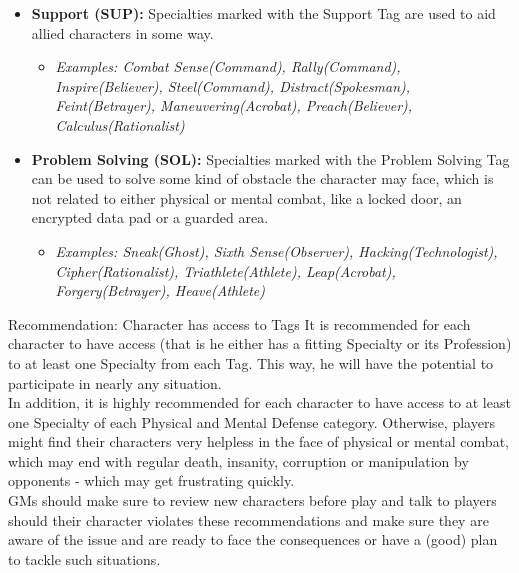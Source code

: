\begin{itemize}
\begin{itemize}
	\end{itemize}
	\item \textbf{Support (SUP):} Specialties marked with the Support Tag are used to aid allied characters in some way.
	\begin{itemize}
		\item \textit{Examples: Combat Sense(Command), Rally(Command), Inspire(Believer), Steel(Command), Distract(Spokesman), Feint(Betrayer), Maneuvering(Acrobat), Preach(Believer), Calculus(Rationalist)}
	\end{itemize}
	\item \textbf{Problem Solving (SOL):} Specialties marked with the Problem Solving Tag can be used to solve some kind of obstacle the character may face, which is not related to either physical or mental combat, like a locked door, an encrypted data pad or a guarded area.
	\begin{itemize}
		\item \textit{Examples: Sneak(Ghost), Sixth Sense(Observer), Hacking(Technologist), Cipher(Rationalist), Triathlete(Athlete), Leap(Acrobat), Forgery(Betrayer), Heave(Athlete)}
	\end{itemize}
\end{itemize}

\begin{DndSidebar}{Recommendation: Character has access to Tags}
It is recommended for each character to have access (that is he either has a fitting Specialty or its Profession) to at least one Specialty from each Tag. 
This way, he will have the potential to participate in nearly any situation.\\\noindent
In addition, it is highly recommended for each character to have access to at least one Specialty of each Physical and Mental Defense category.
Otherwise, players might find their characters very helpless in the face of physical or mental combat, which may end with regular death, insanity, corruption or manipulation by opponents - which may get frustrating quickly.\\
\noindent
GMs should make sure to review new characters before play and talk to players should their character violates these recommendations and make sure they are aware of the issue and are ready to face the consequences or have a (good) plan to tackle such situations.
\end{DndSidebar}


